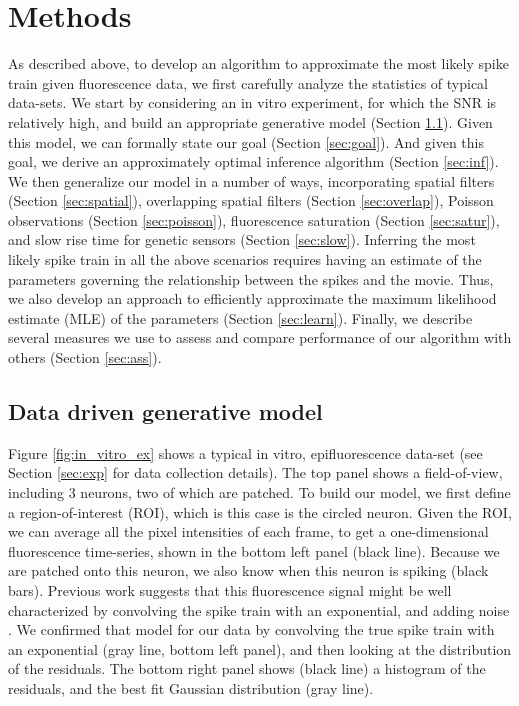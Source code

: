 \section{Methods} \label{sec:methods}

As described above, to develop an algorithm to approximate the most likely spike train given fluorescence data, we first carefully analyze the statistics of typical data-sets.  We start by considering an in vitro experiment, for which the SNR is relatively high, and build an appropriate generative model (Section \ref{sec:model}).  Given this model, we can formally state our goal (Section \ref{sec:goal}).  And given this goal, we derive an approximately optimal inference algorithm (Section \ref{sec:inf}).  We then generalize our model in a number of ways, incorporating spatial filters (Section \ref{sec:spatial}), overlapping spatial filters (Section \ref{sec:overlap}), Poisson observations (Section \ref{sec:poisson}), fluorescence saturation (Section \ref{sec:satur}), and slow rise time for genetic sensors (Section \ref{sec:slow}).  Inferring the most likely spike train in all the above scenarios requires having an estimate of the parameters governing the relationship between the spikes and the movie.  Thus, we also develop an approach to efficiently approximate the maximum likelihood estimate (MLE) of the parameters (Section \ref{sec:learn}).  Finally, we describe several measures we use to assess and compare performance of our algorithm with others (Section \ref{sec:ass}).    

\subsection{Data driven generative model} \label{sec:model}

Figure \ref{fig:in_vitro_ex} shows a typical in vitro, epifluorescence data-set (see Section \ref{sec:exp} for data collection details).  The top panel shows a field-of-view, including 3 neurons, two of which are patched.  To build our model, we first define a region-of-interest (ROI),  which is this case is the circled neuron.  Given the ROI, we can average all the pixel intensities of each frame, to get a one-dimensional fluorescence time-series, shown in the bottom left panel (black line).  Because we are patched onto this neuron, we also know when this neuron is spiking (black bars). 
Previous work suggests that this fluorescence signal might be well characterized by convolving the spike train with an exponential, and adding noise \cite{ImagingManual}.  We confirmed that model for our data by convolving the true spike train with an exponential (gray line, bottom left panel), and then looking at the distribution of the residuals.  The bottom right panel shows (black line) a histogram of the residuals, and the best fit Gaussian distribution (gray line).


